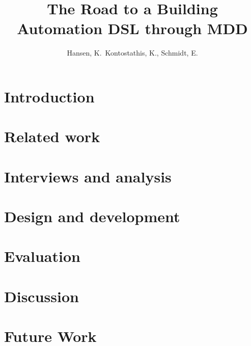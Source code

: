 \documentclass{"The Road to a Building Automation DSL through MDD"}
\begin{document}
\pagestyle{headings}
\title{The Road to a Building Automation DSL through MDD}
\author{Hansen, K.\, Kontostathis, K., Schmidt, E.}
\maketitle

\vspace{-0.3cm}



\vspace{-0.5cm}

\section{Introduction}\label{sec:introduction}


\section{Related work}\label{sec:relatedwork}


\section{Interviews and analysis}\label{sec:interviewsAndAnalysis}


\section{Design and development}\label{sec:designAndDevelopment} 


\section{Evaluation}\label{sec:evaluation} 

 
\section{Discussion}\label{sec:discussion}


\section{Future Work}\label{subsec:futureWork}

\end{document}
